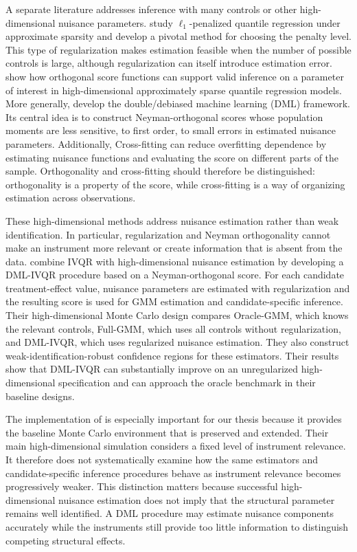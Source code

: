 A separate literature addresses inference with many controls or other high-dimensional nuisance parameters. \textcite{belloni_chernozhukov_2011} study \(\ell_1\)-penalized quantile regression under approximate sparsity and develop a pivotal method for choosing the penalty level. This type of regularization makes estimation feasible when the number of possible controls is large, although regularization can itself introduce estimation error. \textcite{belloni_chernozhukov_kato_2019} show how orthogonal score functions can support valid inference on a parameter of interest in high-dimensional approximately sparse quantile regression models. More generally, \textcite{chernozhukov_et_al_2018} develop the double/debiased machine learning (DML) framework. Its central idea is to construct Neyman-orthogonal scores whose population moments are less sensitive, to first order, to small errors in estimated nuisance parameters. Additionally, Cross-fitting can reduce overfitting dependence by estimating nuisance functions and evaluating the score on different parts of the sample. Orthogonality and cross-fitting should therefore be distinguished: orthogonality is a property of the score, while cross-fitting is a way of organizing estimation across observations.

These high-dimensional methods address nuisance estimation rather than weak identification. In particular, regularization and Neyman orthogonality cannot make an instrument more relevant or create information that is absent from the data. \textcite{chen_huang_tien_2021} combine IVQR with high-dimensional nuisance estimation by developing a DML-IVQR procedure based on a Neyman-orthogonal score. For each candidate treatment-effect value, nuisance parameters are estimated with regularization and the resulting score is used for GMM estimation and candidate-specific inference. Their high-dimensional Monte Carlo design compares Oracle-GMM, which knows the relevant controls, Full-GMM, which uses all controls without regularization, and DML-IVQR, which uses regularized nuisance estimation. They also construct weak-identification-robust confidence regions for these estimators. Their results show that DML-IVQR can substantially improve on an unregularized high-dimensional specification and can approach the oracle benchmark in their baseline designs.

The implementation of \textcite{chen_huang_tien_2021} is especially important for our thesis because it provides the baseline Monte Carlo environment that is preserved and extended. Their main high-dimensional simulation considers a fixed level of instrument relevance. It therefore does not systematically examine how the same estimators and candidate-specific inference procedures behave as instrument relevance becomes progressively weaker. This distinction matters because successful high-dimensional nuisance estimation does not imply that the structural parameter remains well identified. A DML procedure may estimate nuisance components accurately while the instruments still provide too little information to distinguish competing structural effects.

